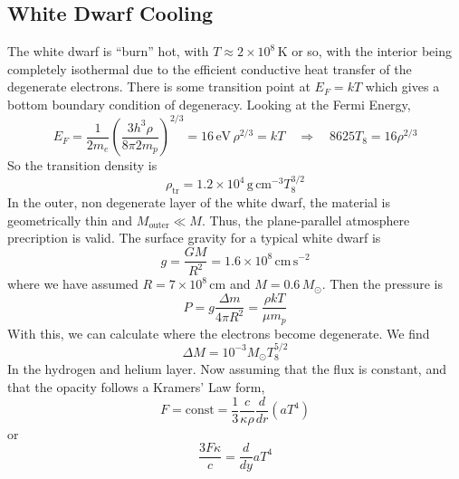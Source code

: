 \documentclass[10pt]{article}
\numberwithin{equation}{section}
\newcommand{\n}{\noindent}
\begin{document}
    \subsection{White Dwarf Cooling}
    \label{sec:white-dwarf-cooling}
    The white dwarf is ``burn'' hot, with $T\approx 2\times
    10^8\,\mathrm{K}$ or so, with the interior being completely
    isothermal due to the efficient conductive heat transfer of the
    degenerate electrons. There is some transition point at $E_F=kT$
    which gives a bottom boundary condition of degeneracy. Looking at
    the Fermi Energy,
    \begin{equation}
      \label{eq:334}
      E_F=\frac{1}{2m_e}\left(\frac{3h^3\rho}{8\pi
          2m_p}\right)^{2/3}=16\,\mathrm{eV}\,\rho^{2/3} =k T\quad
      \Rightarrow \quad 8625 T_8=16\rho^{2/3}
    \end{equation}
    So the transition density is
    \begin{equation}
      \label{eq:335}
      \rho_{\mathrm{tr}}=1.2\times 10^4\,\mathrm{g\,cm^{-3}}T_8^{3/2}
    \end{equation}
    \n In the outer, non degenerate layer of the white dwarf, the
    material is geometrically thin and $M_{\mathrm{outer}}\ll
    M$. Thus, the plane-parallel atmosphere precription is valid. The
    surface gravity for a typical white dwarf is
    \begin{equation}
      \label{eq:291}
      g=\frac{GM}{R^2}=1.6\times 10^8\,\mathrm{cm\,s^{-2}}
    \end{equation}
    where we have assumed $R=7\times 10^8\,\mathrm{cm}$ and
    $M=0.6\,M_\odot$. Then the pressure is
    \begin{equation}
      \label{eq:292}
      P=g\frac{\Delta m}{4\pi R^2}=\frac{\rho kT}{\mu m_p}
    \end{equation}
    With this, we can calculate where the electrons become
    degenerate. We find
    \begin{equation}
      \label{eq:293}
      \Delta M=10^{-3}M_\odot T_8^{5/2}
    \end{equation}
    In the hydrogen and helium layer. Now assuming that the flux is
    constant, and that the opacity follows a Kramers' Law form,
    \begin{equation}
      \label{eq:294}
      F=\mathrm{const}=\frac{1}{3}\frac{c}{\kappa\rho}\frac{d}{dr}\left
(aT^4\right)
    \end{equation}
    or
    \begin{equation}
      \label{eq:295}
      \frac{3F\kappa}{c}=\frac{d}{dy}aT^4
    \end{equation}
\end{document}
